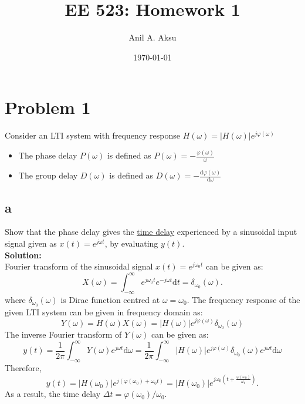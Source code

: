 \documentclass[11pt]{amsart}
\title{EE 523: Homework 1}
\author{Anil A. Aksu}
\date{\today}
\begin{document}
\maketitle

\section*{Problem 1 }
Consider an LTI system with frequency response $H(\omega)=\left | H(\omega) \right | e^{j \varphi(\omega) }$

\begin{itemize}
\item The phase delay $P(\omega)$ is defined as $P(\omega)=-\frac{\varphi(\omega)}{\omega}$
\item The group delay $D(\omega)$ is defined as $D(\omega)=-\frac{ \mathrm{d}\varphi(\omega)}{  \mathrm{d}\omega}$
\end{itemize}

\subsection*{a}
Show that the phase delay gives the \underline{time delay} experienced by a sinusoidal input signal given
as $x(t)=e^{j \omega t}$, by evaluating $y(t)$.
\\
\textbf{Solution:}\\
Fourier transform of the sinusoidal signal $x(t)=e^{j \omega_0 t}$ can be given as:
\begin{equation}
X(\omega)=\int_{-\infty}^{\infty}e^{j \omega_0 t} e^{-j \omega t} \mathrm{d}t=\delta_{\omega_0}(\omega).
\end{equation}
where $\delta_{\omega_0}(\omega)$ is Dirac function centred at $\omega=\omega_0$. The frequency response of the given LTI system can be given in frequency domain as:
\begin{equation}
Y(\omega)=H(\omega)X(\omega)=\left | H(\omega) \right | e^{j \varphi(\omega) } \delta_{\omega_0}(\omega)
\end{equation}
The inverse Fourier transform of $Y(\omega)$ can be given as:
\begin{equation}
y(t)=\frac{1}{2 \pi}\int_{-\infty}^{\infty}Y(\omega)e^{j \omega t} \mathrm{d} \omega=\frac{1}{2 \pi}\int_{-\infty}^{\infty}\left | H(\omega) \right | e^{j \varphi(\omega) } \delta_{\omega_0}(\omega)e^{j \omega t} \mathrm{d} \omega
\end{equation}
Therefore,
\begin{equation}
y(t)=\left | H(\omega_0) \right | e^{j (\varphi(\omega_0)+ \omega_0 t )}=\left | H(\omega_0) \right | e^{j  \omega_0( t + \frac{\varphi(\omega_0)}{\omega_0} )}.
\end{equation}
As a result, the time delay $\Delta t = \varphi(\omega_0)/ \omega_0$.
\end{document}
